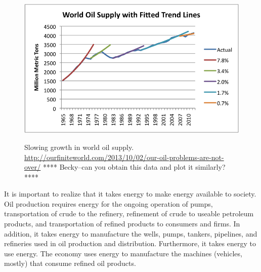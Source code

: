 \begin{figure}[!ht]
\centering\
\includegraphics[width=\linewidth]{Part_0/Chapter_Introduction/images/growth-in-world-oil-supply.png}
\caption[World Oil Supply]{Slowing growth in world oil supply.
\url{http://ourfiniteworld.com/2013/10/02/our-oil-problems-are-not-over/}
**** Becky--can you obtain this data and plot it similarly? ****
}
\label{fig:oil_production}
\end{figure}

It is important to realize that it takes energy to make energy available to society.
Oil production requires energy for the ongoing
operation of pumps, 
transportation of crude to the refinery,
refinement of crude to useable petroleum products, and 
transportation of refined products to consumers and firms.
In addition, it takes energy to manufacture the wells, pumps, 
tankers, pipelines, and
refineries used in oil production and distribution.
Furthermore, it takes energy to use energy. 
The economy uses energy to manufacture the machines (vehicles, mostly)
that consume refined oil products.

